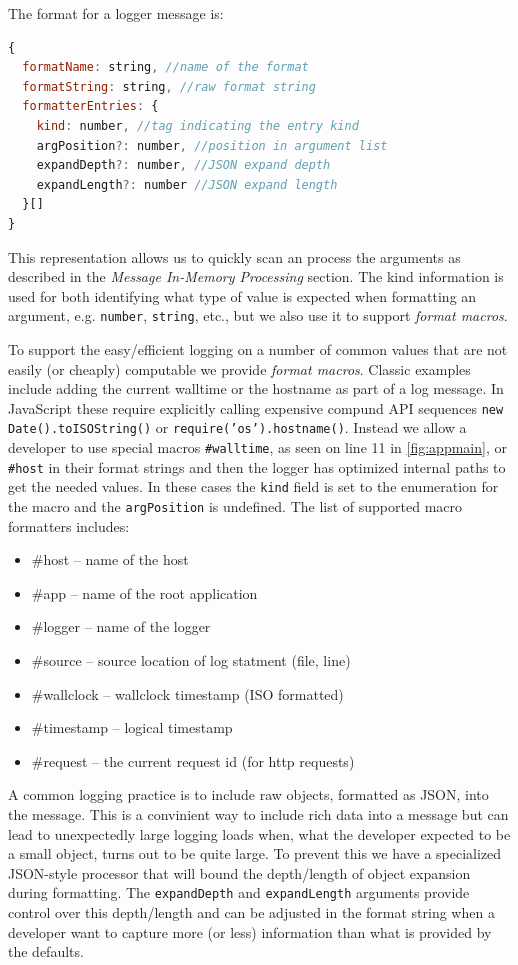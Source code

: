 The format for a logger message is:
\begin{lstlisting}[language=JavaScript,basicstyle=\scriptsize]
{
  formatName: string, //name of the format
  formatString: string, //raw format string
  formatterEntries: {
    kind: number, //tag indicating the entry kind
    argPosition?: number, //position in argument list
    expandDepth?: number, //JSON expand depth
    expandLength?: number //JSON expand length
  }[]
}
\end{lstlisting}

This representation allows us to quickly scan an process the arguments as 
described in the \emph{Message In-Memory Processing} section. The kind 
information is used for both identifying what type of value is expected 
when formatting an argument, e.g. \texttt{number}, \texttt{string}, etc., 
but we also use it to support \emph{format macros}.

To support the easy/efficient logging on a number of common values that 
are not easily (or cheaply) computable we provide \emph{format macros}. 
Classic examples include adding the current walltime or the hostname as 
part of a log message. In JavaScript these require explicitly calling 
expensive compund API sequences \texttt{new Date().toISOString()} or 
\texttt{require('os').hostname()}. Instead we allow a developer to use 
special macros \texttt{\#walltime}, as seen on line 11 in \autoref{fig:appmain}, 
or \texttt{\#host} in their format 
strings and then the logger has optimized internal paths to get the needed 
values. In these cases the \texttt{kind} field is set to the enumeration 
for the macro and the \texttt{argPosition} is undefined. The list of supported 
macro formatters includes:
\begin{itemize}
  \item \#host -- name of the host
  \item \#app -- name of the root application
  \item \#logger -- name of the logger
  \item \#source -- source location of log statment (file, line)
  \item \#wallclock -- wallclock timestamp (ISO formatted)
  \item \#timestamp -- logical timestamp
  \item \#request   -- the current request id (for http requests)
\end{itemize}

A common logging practice is to include raw objects, formatted as JSON, into the 
message. This is a convinient way to include rich data into a message but can 
lead to unexpectedly large logging loads when, what the developer expected to 
be a small object, turns out to be quite large. To prevent this we have a specialized 
JSON-style processor that will bound the depth/length of object expansion during 
formatting. The \texttt{expandDepth} and \texttt{expandLength} arguments provide 
control over this depth/length and can be adjusted in the format string when a 
developer want to capture more (or less) information than what is provided by the 
defaults.


